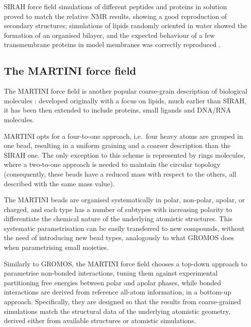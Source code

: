 SIRAH force field simulations of different peptides and proteins in solution proved to match the relative NMR results, showing a good reproduction of secondary structures; simulations of lipids randomly oriented in water showed the formation of an organised bilayer, and the expected behaviour of a few transmembrane proteins in model membranes was correctly reproduced \citep{Machado2018,Barrera2019}.

 
\subsection{The MARTINI force field}
The MARTINI force field is another popular coarse-grain description of biological molecules \citep{Marrink2007,Monticelli2008,DeJong2013}: developed originally with a focus on lipids, much earlier than SIRAH, it has been then extended to include proteins, small ligands and DNA/RNA molecules.

MARTINI opts for a four-to-one approach, i.e.\ four heavy atoms are grouped in one bead, resulting in a uniform graining and a coarser description than the SIRAH one. The only exception to this scheme is represented by rings molecules, where a two-to-one approach is needed to maintain the circular topology (consequently, these beads have a reduced mass with respect to the others, all described with the same mass value).

The MARTINI beads are organised systematically in polar, non-polar, apolar, or charged, and each type has a number of subtypes with increasing polarity to differentiate the chemical nature of the underlying atomistic structures.
%
This systematic parametrisation can be easily transferred to new compounds, without the need of introducing new bead types, analogously to what GROMOS does when parametrising small moieties.

Similarly to GROMOS, the MARTINI force field chooses a top-down approach to parametrise non-bonded interactions, tuning them against experimental partitioning free energies between polar and apolar phases, while bonded interactions are derived from reference all-atom information, in a bottom-up approach.
%
Specifically, they are designed so that the results from coarse-grained simulations match the structural data of the underlying atomistic geometry, derived either from available structures or atomistic simulations. %

